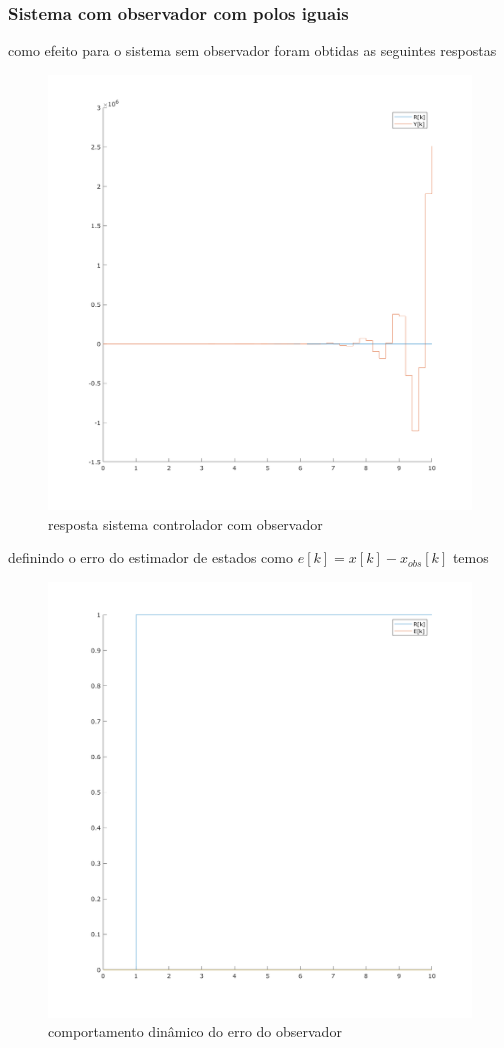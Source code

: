 \documentclass[a4paper,11pt]{article}
\begin{document}
\subsubsection{Sistema com observador com polos iguais}

como efeito para o sistema sem observador foram obtidas as seguintes respostas

\begin{figure}[H]
    \centering
    \includegraphics[width=0.9\linewidth]{img/exsim6-ssobs10-sim.png}
    \caption{resposta sistema controlador com observador}
    \label{fig:e6-ssobs10-state-sim}
\end{figure}

definindo o erro do estimador de estados como $e[k] = x[k] - x_{obs}[k]$ temos

\begin{figure}[H]
    \centering
    \includegraphics[width=0.9\linewidth]{img/exsim6-ssobs10-err-sim.png}
    \caption{comportamento dinâmico do erro do observador}
\end{figure}
\end{document}
